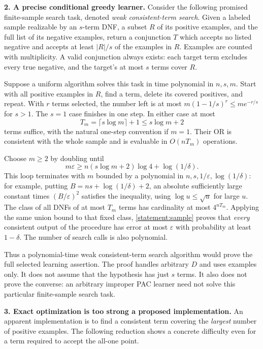\documentclass[11pt,a4paper]{article}
\newcommand{\eps}{\varepsilon}
\numberwithin{equation}{section}
\begin{document}
\textbf{2. A precise conditional greedy learner.}
Consider the following promised finite-sample search task, denoted
\emph{weak consistent-term search}. Given a labeled sample realizable by
an $s$-term DNF, a subset $R$ of its positive examples, and the full list
of its negative examples, return a conjunction $T$ which accepts no
listed negative and accepts at least $|R|/s$ of the examples in $R$.
Examples are counted with multiplicity. A valid conjunction always
exists: each target term excludes every true negative, and the target's
at most $s$ terms cover $R$.

Suppose a uniform algorithm solves this task in time polynomial in
$n,s,m$. Start with all positive examples in $R$, find a term, delete
its covered positives, and repeat. With $r$ terms selected, the number
left is at most $m(1-1/s)^r\le me^{-r/s}$ for $s>1$.
The $s=1$ case finishes in one step. In either case at most
\[
 T_m=\lceil s\log m\rceil+1\le s\log m+2
\]
terms suffice, with the natural one-step convention if $m=1$.
Their OR is consistent with the whole sample and is evaluable in
$O(nT_m)$ operations.

Choose $m\ge2$ by doubling until
\begin{equation}\label{statement:sample}
 m\eps\ge n(s\log m+2)\log4+\log(1/\delta).
\end{equation}
This loop terminates with $m$ bounded by a polynomial in
$n,s,1/\eps,\log(1/\delta)$: for example, putting
$B=ns+\log(1/\delta)+2$, an absolute sufficiently large constant times
$(B/\eps)^2$ satisfies the inequality, using $\log u\le\sqrt u$ for
large $u$. The class of all DNFs of at most $T_m$ terms has cardinality
at most $4^{nT_m}$. Applying the same union bound to that fixed class,
\eqref{statement:sample} proves that \emph{every} consistent output of the
procedure has error at most $\eps$ with probability at least $1-\delta$.
The number of search calls is also polynomial.

Thus a polynomial-time weak consistent-term search algorithm would prove
the full selected learning assertion. The proof handles arbitrary $D$
and uses examples only. It does not assume that the hypothesis has just
$s$ terms. It also does not prove the converse: an arbitrary improper
PAC learner need not solve this particular finite-sample search task.

\textbf{3. Exact optimization is too strong a proposed implementation.}
An apparent implementation is to find a consistent term covering the
\emph{largest} number of positive examples. The following reduction
shows a concrete difficulty even for a term required to accept the
all-one point.
\end{document}
